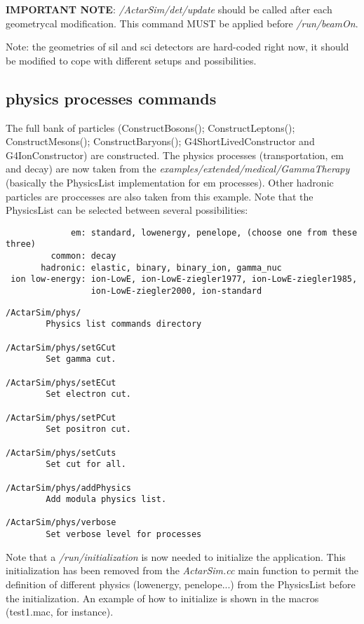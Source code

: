 \textbf{IMPORTANT NOTE}: \textit{/ActarSim/det/update} should be called after each geometrycal modification. This command MUST be applied before \textit{/run/beamOn}.

Note: the geometries of sil and sci detectors are hard-coded right now, it should be modified to cope with different setups and possibilities.

\subsection{physics processes commands}
The full bank of particles  (ConstructBosons(); ConstructLeptons(); ConstructMesons(); ConstructBaryons(); G4ShortLivedConstructor and
G4IonConstructor) are constructed. The physics processes (transportation, em and decay) are now taken from the \textit{examples/extended/medical/GammaTherapy} (basically the PhysicsList implementation for em processes). Other hadronic particles are proccesses are also taken from this example. Note that the PhysicsList can be selected between several possibilities:

\begin{verbatim}
             em: standard, lowenergy, penelope, (choose one from these three)
         common: decay
       hadronic: elastic, binary, binary_ion, gamma_nuc
 ion low-energy: ion-LowE, ion-LowE-ziegler1977, ion-LowE-ziegler1985,
                 ion-LowE-ziegler2000, ion-standard
\end{verbatim}

\begin{verbatim}
/ActarSim/phys/
        Physics list commands directory

/ActarSim/phys/setGCut
        Set gamma cut.

/ActarSim/phys/setECut
        Set electron cut.

/ActarSim/phys/setPCut
        Set positron cut.

/ActarSim/phys/setCuts
        Set cut for all.

/ActarSim/phys/addPhysics
        Add modula physics list.

/ActarSim/phys/verbose
        Set verbose level for processes
\end{verbatim}

Note that a \textit{/run/initialization} is now needed to initialize the application. This initialization has been removed from the \textit{ActarSim.cc} main function to permit the definition of different physics (lowenergy, penelope...) from the PhysicsList before the initialization. An example of how to initialize is shown in the macros (test1.mac, for instance).

